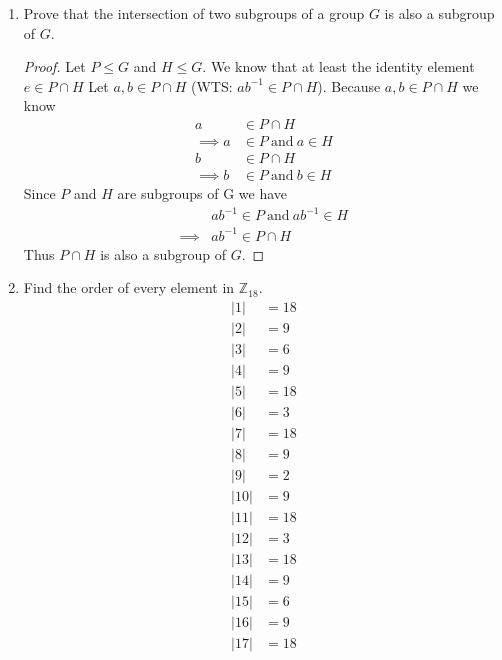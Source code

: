 \documentclass[12pt]{article}
\newcommand\setitemnumber[1]{\setcounter{enumi}{\numexpr#1-1\relax}}
\begin{document}
\begin{enumerate}[label=\textbf{\arabic*}.]
\begin{proof}
            $\therefore$ By the 2 step test $G$ is a subgroup of $\mathbb{R}^*$ under the operation of multiplication.
	      \end{proof}
          \pagebreak
    \setitemnumber{45}
    \item Prove that the intersection of two subgroups of a group $G$ is also a subgroup of $G$.
          \begin{proof} Let $P \leq G$ and $H \leq G$. We know that at least the identity element $e \in P \cap H$ Let $a,b \in P \cap H$
            (WTS\@: $ab^{-1} \in P \cap H$). Because $a,b \in P \cap H$ we know
            \begin{align*}
                a &\in P \cap H \\
                \implies a &\in P \ \text{and} \ a \in H \\
                b &\in P \cap H \\
                \implies b &\in P \ \text{and} \ b \in H
            \end{align*}
            Since $P$ and $H$ are subgroups of G we have
            \begin{align*}
                &ab^{-1} \in P \ \text{and} \ ab^{-1} \in H \\
                \implies &ab^{-1} \in P \cap H
            \end{align*}
            Thus $P \cap H$ is also a subgroup of $G$.
          \end{proof}
    \setitemnumber{5}
    \item Find the order of every element in $\mathbb{Z}_{18}$.
    \begin{align*}
    |1|&=18 \\
    |2|&=9 \\
    |3|&=6 \\
    |4|&=9 \\
    |5|&=18 \\
    |6|&=3 \\
    |7|&=18 \\
    |8|&=9 \\
    |9|&=2 \\
    |10|&=9 \\
    |11|&=18 \\
    |12|&=3 \\
    |13|&=18 \\
    |14|&=9 \\
    |15|&=6 \\
    |16|&=9 \\
    |17|&=18 \\

\end{align*}
\end{enumerate}
\end{document}
